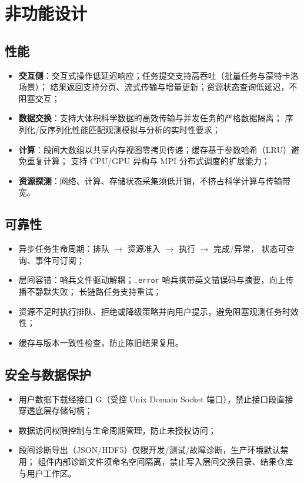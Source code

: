 \section{非功能设计}
\label{sec:nonfunctional}

\subsection{性能}

\begin{itemize}
  \item \textbf{交互侧}：交互式操作低延迟响应；任务提交支持高吞吐（批量任务与蒙特卡洛场景）；
        结果返回支持分页、流式传输与增量更新；资源状态查询低延迟，不阻塞交互；
  \item \textbf{数据交换}：支持大体积科学数据的高效传输与并发任务的严格数据隔离；
        序列化/反序列化性能匹配观测模拟与分析的实时性要求；
  \item \textbf{计算}：段间大数组以共享内存视图零拷贝传递；缓存基于参数哈希（LRU）避免重复计算；
        支持 CPU/GPU 异构与 MPI 分布式调度的扩展能力；
  \item \textbf{资源探测}：网络、计算、存储状态采集须低开销，不挤占科学计算与传输带宽。
\end{itemize}

\subsection{可靠性}

\begin{itemize}
  \item 异步任务生命周期：排队 $\rightarrow$ 资源准入 $\rightarrow$ 执行 $\rightarrow$ 完成/异常，
        状态可查询、事件可订阅；
  \item 层间容错：哨兵文件驱动解耦；\texttt{.error} 哨兵携带英文错误码与摘要，向上传播不静默失败；
        长链路任务支持重试；
  \item 资源不足时执行排队、拒绝或降级策略并向用户提示，避免阻塞观测任务时效性；
  \item 缓存与版本一致性检查，防止陈旧结果复用。
\end{itemize}

\subsection{安全与数据保护}

\begin{itemize}
  \item 用户数据下载经接口 G（受控 Unix Domain Socket 端口），禁止接口段直接穿透底层存储句柄；
  \item 数据访问权限控制与生命周期管理，防止未授权访问；
  \item 段间诊断导出（JSON/HDF5）仅限开发/测试/故障诊断，生产环境默认禁用；
        组件内部诊断文件须命名空间隔离，禁止写入层间交换目录、结果仓库与用户工作区。
\end{itemize}

